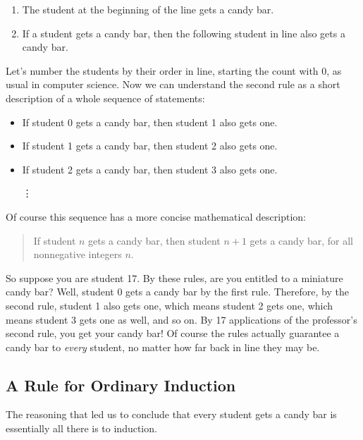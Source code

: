 \begin{enumerate}
\item The student at the beginning of the line gets a candy bar.
\item If a student gets a candy bar, then the following student in line
  also gets a candy bar.
\end{enumerate}
%
Let's number the students by their order in line, starting the count with
0, as usual in computer science.  Now we can understand the second rule as
a short description of a whole sequence of statements:
%
\begin{itemize}
\item If student 0 gets a candy bar, then student 1 also gets one.
\item If student 1 gets a candy bar, then student 2 also gets one.
\item If student 2 gets a candy bar, then student 3 also gets one.

\hspace{1.2in} \vdots
\end{itemize}
%
Of course this sequence has a more concise mathematical description:
\begin{quote}
  If student $n$ gets a candy bar, then student $n+1$ gets a
  candy bar, for all nonnegative integers $n$.
\end{quote}
So suppose you are student 17.  By these rules, are you entitled to a
miniature candy bar?  Well, student 0 gets a candy bar by the first rule.
Therefore, by the second rule, student 1 also gets one, which means
student 2 gets one, which means student 3 gets one as well, and so on.  By
17 applications of the professor's second rule, you get your candy bar!
Of course the rules actually guarantee a candy bar to \emph{every}
student, no matter how far back in line they may be.

\subsection{A Rule for Ordinary Induction}

The reasoning that led us to conclude that every student gets a candy bar is 
essentially all there is to induction.
\iffalse
So our claim that all the Professor's students get a candy bar was simply
an application of the Induction Rule with $P(n)$ defined to be the
predicate, ``student $n$ gets a candy bar.''
\fi


